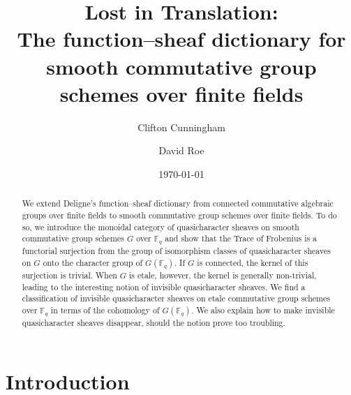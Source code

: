 \documentclass{amsart}
\title[Lost in Translation: The function--sheaf dictionary]{Lost in Translation: \\ The function--sheaf dictionary for smooth commutative group schemes over finite fields}
\date{\today}
\author{Clifton Cunningham}
\author{David Roe}
\theoremstyle{plain}
\theoremstyle{definition}
\theoremstyle{remark}
\begin{document}
\begin{abstract}
  We extend Deligne's function--sheaf dictionary from
  connected commutative algebraic groups over finite fields to smooth
  commutative group schemes over finite fields.
  To do so, we introduce the monoidal category of quasicharacter sheaves on
  smooth commutative group schemes $G$ over $\mathbb{F}_q$
  and show that the Trace of Frobenius is a functorial surjection
  from the group of isomorphism classes of quasicharacter sheaves on $G$
  onto the character group of $G(\mathbb{F}_q)$.
  If $G$ is connected, the kernel of this surjection is trivial.
  When $G$ is etale, however, the kernel is generally non-trivial,
  leading to the interesting notion of invisible quasicharacter sheaves.
  We find a classification of invisible quasicharacter sheaves
  on etale commutative group schemes over $\mathbb{F}_q$
  in terms of the cohomology of $G(\mathbb{F}_q)$.
  We also explain how to make invisible quasicharacter sheaves disappear,
  should the notion prove too troubling.
   \end{abstract}

\maketitle

\section*{Introduction}
\end{document}
